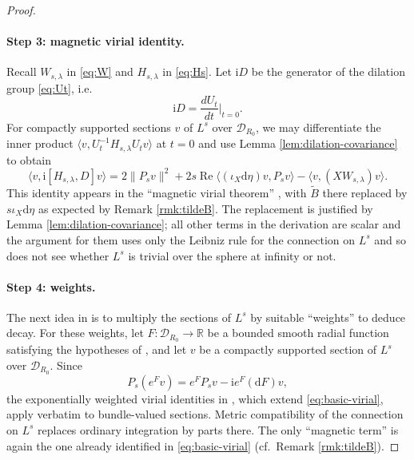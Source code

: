 \documentclass{article}
\theoremstyle{definition}
\numberwithin{thm}{section}
\numberwithin{equation}{section}
\def\R{\mathbb{R}}
\newcommand{\ii}{\mathrm i}
\newcommand{\dd}{\mathrm d}
\newcommand{\ip}[2]{\langle #1,#2\rangle}
\newcommand{\norm}[1]{\lVert #1\rVert}
\begin{document}
\begin{proof}
\paragraph{\bf Step 3: magnetic virial identity.} Recall $W_{s,\lambda}$ in \eqref{eq:W} and $H_{s,\lambda}$ in \eqref{eq:Hs}.  Let $\ii D$ be the generator of the dilation group \eqref{eq:Ut}, i.e.
\begin{equation}\label{eq:generator}
\ii D=\frac{dU_t}{dt}|_{t=0}.    
\end{equation}
For compactly supported  sections $v$ of $L^s$ over $\mathcal{D}_{R_0}$, we may differentiate the inner product $\ip{v}{U_t^{-1}H_{s,\lambda}U_tv}$ at $t=0$ and use Lemma \ref{lem:dilation-covariance} to obtain
\begin{equation}\label{eq:basic-virial}
        \ip{v}{\ii[H_{s,\lambda},D]v}
        =2\norm{P_sv}^2
         +2s\operatorname{Re}\ip{(\iota_X\dd\eta)v}{P_sv}
         -\ip{v}{(XW_{s,\lambda})v}.
\end{equation}
This identity appears in the ``magnetic virial theorem''  \cite[Theorem 3.8]{AHK}, with $\tilde{B}$ there replaced by $s\iota_X\dd\eta$ as expected by Remark \ref{rmk:tildeB}.  The replacement is justified by Lemma \ref{lem:dilation-covariance}; all other terms in the derivation are scalar and the argument for them uses only the Leibniz rule for the connection on $L^s$ and so does not see whether $L^s$ is  trivial over the sphere at infinity or not. 

\paragraph{\bf Step 4: weights.}  The next idea in \cite[Section 3]{AHK} is to multiply the sections of $L^s$ by suitable ``weights'' to deduce decay.  For these weights, let  $F:\mathcal{D}_{R_0}\to \R$ be a bounded smooth radial function satisfying the hypotheses of \cite[Lemma 3.16]{AHK}, and let $v$ be a compactly supported section of $L^s$ over $\mathcal{D}_{R_0}$.  Since
\begin{equation}\label{eq:vF}
        P_s (e^Fv)=e^FP_s v-\ii e^F(\dd F)v,
\end{equation}
the exponentially weighted virial identities in \cite[Section 3.4]{AHK}, which extend \eqref{eq:basic-virial}, apply verbatim to bundle-valued sections.  Metric compatibility of the connection on $L^s$ replaces ordinary integration by parts there.  The only ``magnetic term'' is again the one already identified in \eqref{eq:basic-virial} (cf.~Remark \ref{rmk:tildeB}).  


\end{proof}
\end{document}
